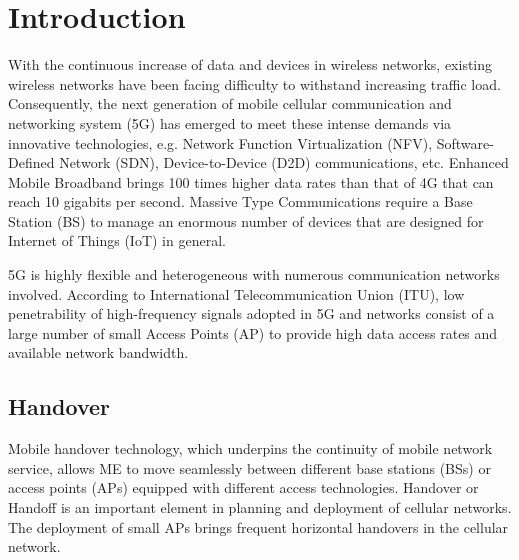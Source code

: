 \chapter{Introduction}

{
    With the continuous increase of data and devices in wireless networks, 
existing wireless networks have been facing difficulty to withstand 
increasing traffic load. Consequently, the next generation of mobile 
cellular communication and networking system (5G) has emerged to meet 
these intense demands via innovative technologies, e.g. Network Function 
Virtualization (NFV), Software-Defined Network (SDN), Device-to-Device (D2D) 
communications, etc. Enhanced Mobile Broadband brings 100 times higher 
data rates than that of 4G that can reach 10 gigabits per second. Massive 
Type Communications require a Base Station (BS) to manage an enormous 
number of devices that are designed for Internet of Things (IoT) in general. \\
}


{
    5G is highly flexible and heterogeneous with numerous communication 
    networks involved. According to International Telecommunication Union (ITU),  
    low penetrability of high-frequency signals adopted in 5G and networks 
    consist of a large number of small Access Points (AP) to provide high 
    data access rates and available network bandwidth. \\
}

\section{Handover}
{
    Mobile handover technology, which underpins the continuity of mobile 
    network service, allows ME to move seamlessly between different base 
    stations (BSs) or access points (APs) equipped with different access 
    technologies. Handover or Handoff is an important element in planning and deployment 
    of cellular networks. The deployment of small APs brings frequent 
    horizontal handovers in the cellular network.
}

\newpage
